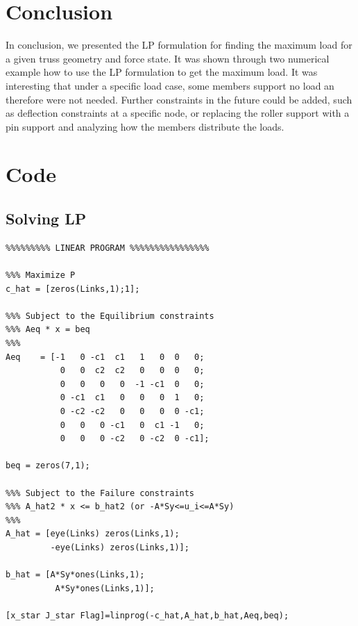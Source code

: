 \documentclass[12pt]{article}
\begin{document}
\section{Conclusion}
In conclusion, we presented the LP formulation for finding the maximum load for a given truss geometry and force state.  It was shown through two numerical example how to use the LP formulation to get the maximum load.  It was interesting that under a specific load case, some members support no load an therefore were not needed.  Further constraints in the future could be added, such as deflection constraints at a specific node, or replacing the roller support with a pin support and analyzing how the members distribute the loads.

\appendix
\section{Code}
\subsection{Solving LP}
\begin{verbatim}
%%%%%%%%% LINEAR PROGRAM %%%%%%%%%%%%%%%%

%%% Maximize P
c_hat = [zeros(Links,1);1];

%%% Subject to the Equilibrium constraints
%%% Aeq * x = beq
%%%
Aeq    = [-1   0 -c1  c1   1   0  0   0;
           0   0  c2  c2   0   0  0   0;
           0   0   0   0  -1 -c1  0   0;
           0 -c1  c1   0   0   0  1   0;
           0 -c2 -c2   0   0   0  0 -c1;
           0   0   0 -c1   0  c1 -1   0;
           0   0   0 -c2   0 -c2  0 -c1];

beq = zeros(7,1);

%%% Subject to the Failure constraints
%%% A_hat2 * x <= b_hat2 (or -A*Sy<=u_i<=A*Sy)
%%%
A_hat = [eye(Links) zeros(Links,1);
         -eye(Links) zeros(Links,1)];

b_hat = [A*Sy*ones(Links,1);
          A*Sy*ones(Links,1)];

[x_star J_star Flag]=linprog(-c_hat,A_hat,b_hat,Aeq,beq);
\end{verbatim}
\end{document}
